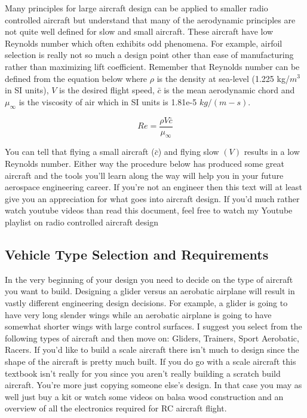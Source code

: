 \documentclass{article}
\begin{document}
Many principles for large aircraft design can be applied to smaller
radio controlled aircraft but understand that many of the aerodynamic
principles are not quite well defined for slow and small
aircraft. These aircraft have low Reynolds number which often exhibits
odd phenomena. For example, airfoil selection is really not so much a
design point other than ease of manufacturing rather than maximizing
lift coefficient. Remember that Reynolds number can be defined from
the equation below where $\rho$ is the density at sea-level (1.225
kg/$m^3$ in SI units), $V$ is
the desired flight speed, $\bar{c}$ is the mean aerodynamic chord and
$\mu_{\infty}$ is the viscosity of air which in SI units is 1.81e-5
$kg/(m-s)$. 

\begin{equation}
Re = \frac{\rho V \bar{c}}{\mu_{\infty}}
\end{equation}

You can tell that flying a small aircraft ($\bar{c}$) and flying slow
$(V)$ results in a low Reynolds number. Either way the procedure below
has produced some great aircraft and the tools you'll learn along the
way will help you in your future aerospace engineering career. If
you're not an engineer then this text will at least give you an
appreciation for what goes into aircraft design. If you'd much rather
watch youtube videos than read this document, feel free to watch my
Youtube playlist on radio controlled aircraft design\cite{RCYoutube}

\subsection{Vehicle Type Selection and Requirements}

In the very beginning of your design you need to decide on the type of
aircraft you want to build. Designing a glider versus an aerobatic
airplane will result in vastly different engineering design
decisions. For example, a glider is going to have very long slender
wings while an aerobatic airplane is going to have somewhat shorter
wings with large control surfaces. I suggest you select from the
following types of aircraft and then move on: Gliders, Trainers, Sport
Aerobatic, Racers. If you'd like to build a scale aircraft there isn't
much to design since the shape of the aircraft is pretty much
built. If you do go with a scale aircraft this textbook isn't really
for you since you aren't really building a scratch build
aircraft. You're more just copying someone else's design. In that case
you may as well just buy a kit or watch some videos on balsa wood
construction and an overview of all the electronics required for RC
aircraft flight.
\end{document}
